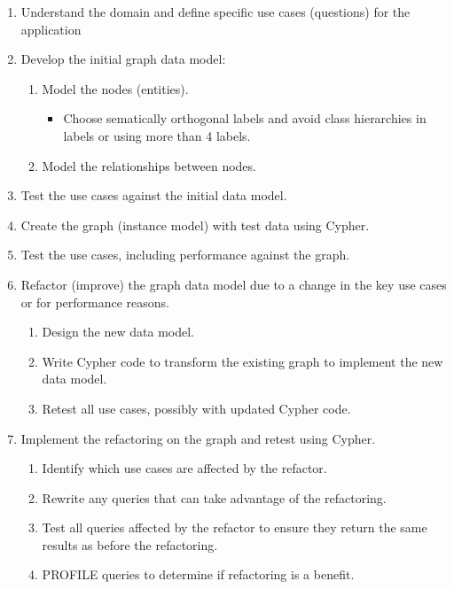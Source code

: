 \documentclass[
  british,
]{article}
\providecommand{\tightlist}{%
  \setlength{\itemsep}{0pt}\setlength{\parskip}{0pt}}
\begin{document}
\begin{enumerate}
\def\labelenumi{\arabic{enumi}.}
\tightlist
\item
  Understand the domain and define specific use cases (questions) for
  the application
\item
  Develop the initial graph data model:

  \begin{enumerate}
  \def\labelenumii{\arabic{enumii}.}
  \tightlist
  \item
    Model the nodes (entities).

    \begin{itemize}
    \tightlist
    \item
      Choose sematically orthogonal labels and avoid class hierarchies
      in labels or using more than 4 labels.
    \end{itemize}
  \item
    Model the relationships between nodes.
  \end{enumerate}
\item
  Test the use cases against the initial data model.
\item
  Create the graph (instance model) with test data using Cypher.
\item
  Test the use cases, including performance against the graph.
\item
  Refactor (improve) the graph data model due to a change in the key use
  cases or for performance reasons.

  \begin{enumerate}
  \def\labelenumii{\arabic{enumii}.}
  \tightlist
  \item
    Design the new data model.
  \item
    Write Cypher code to transform the existing graph to implement the
    new data model.
  \item
    Retest all use cases, possibly with updated Cypher code.
  \end{enumerate}
\item
  Implement the refactoring on the graph and retest using Cypher.

  \begin{enumerate}
  \def\labelenumii{\arabic{enumii}.}
  \tightlist
  \item
    Identify which use cases are affected by the refactor.
  \item
    Rewrite any queries that can take advantage of the refactoring.
  \item
    Test all queries affected by the refactor to ensure they return the
    same results as before the refactoring.
  \item
    PROFILE queries to determine if refactoring is a benefit.
  \end{enumerate}
\end{enumerate}
\end{document}
